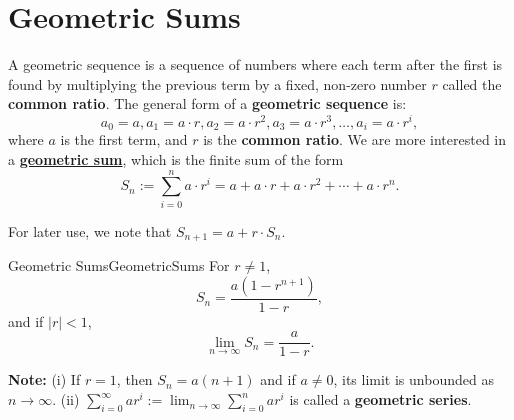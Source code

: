 \Qed

\section{Geometric Sums}



A geometric sequence is a sequence of numbers where each term after the first is found by multiplying the previous term by a fixed, non-zero number $r$ called the \textbf{common ratio}. The general form of a \textbf{geometric sequence} is:
$$ a_0=a, a_1=a\cdot r, a_2 = a\cdot r^2, a_3= a\cdot r^3, \dots , a_i = a \cdot r^i,$$
where $a$ is the first term, and $r$ is the \textbf{common ratio}. We are more interested in a \href{https://en.wikipedia.org/wiki/Geometric_series?wprov=srpw1_0}{\bf geometric sum}, which is the finite sum of the form
\begin{equation}
\label{eq:RecurionForGeometricSum}
    S_n:= \sum_{i=0}^n a \cdot r^i = a + a\cdot r + a \cdot r^2 + \cdots + a \cdot r^n.
\end{equation}



\bigskip

For later use, we note that $S_{n+1} = a + r \cdot S_n$. 

\begin{propColor}{Geometric Sums}{GeometricSums}
    For $r\neq 1$, 
    \begin{equation}
        S_n = \frac{a(1 - r^{n+1})}{1 - r},
    \end{equation}
and if $|r|<1$,
    \begin{equation}
\lim_{n\to \infty}  S_n = \frac{a}{1 - r}.
    \end{equation}

\textbf{Note:} (i) If $r=1$, then $S_n = a(n+1)$ and if $a \neq 0$, its limit is unbounded as $n\to \infty$. (ii) $\sum_{i=0}^\infty a r^i := \displaystyle \lim_{n \to \infty} \sum_{i=0}^n a r^i$   is called a \textbf{geometric series}. 
\end{propColor}

